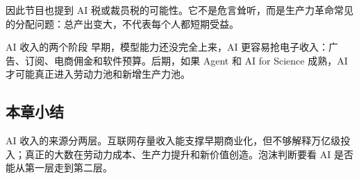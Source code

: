 因此节目也提到 AI 税或裁员税的可能性。它不是危言耸听，而是生产力革命常见的分配问题：总产出变大，不代表每个人都短期受益。

\begin{importantbox}{AI 收入的两个阶段}
早期，模型能力还没完全上来，AI 更容易抢电子收入：广告、订阅、电商佣金和软件预算。后期，如果 Agent 和 AI for Science 成熟，AI 才可能真正进入劳动力池和新增生产力池。
\end{importantbox}

\subsection{本章小结}

AI 收入的来源分两层。互联网存量收入能支撑早期商业化，但不够解释万亿级投入；真正的大数在劳动力成本、生产力提升和新价值创造。泡沫判断要看 AI 是否能从第一层走到第二层。

